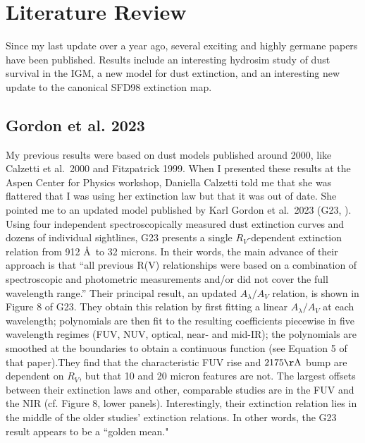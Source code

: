 \documentclass[11pt, oneside]{article}   	%
\begin{document}

\section{Literature Review}\label{sec:literature}
Since my last update over a year ago, several exciting and highly germane papers have been published. Results include an interesting hydrosim study of dust survival in the IGM, a new model for dust extinction, and an interesting new update to the canonical SFD98 extinction map. 
\subsection{Gordon et al. 2023}
My previous results were based on dust models published around 2000, like Calzetti et al.~2000 and Fitzpatrick 1999. When I presented these results at the Aspen Center for Physics workshop, Daniella Calzetti told me that she was flattered that I was using her extinction law but that it was out of date. She pointed me to an updated model published by Karl Gordon et al.~2023 (G23, \cite{2023ApJ...950...86G}). Using four independent spectroscopically measured dust extinction curves and dozens of individual sightlines, G23 presents a single $R_V$-dependent extinction relation from 912 \AA~to 32 microns. In their words, the main advance of their approach is that ``all previous R(V) relationships were based on a combination of spectroscopic and photometric measurements and/or did not cover the full wavelength range.'' Their principal result, an updated $A_\lambda/A_V$ relation, is shown in Figure 8 of G23. 
They obtain this relation by first fitting a linear $A_\lambda/A_V$ at each wavelength; polynomials are then fit to the resulting coefficients piecewise in five wavelength regimes (FUV, NUV, optical, near- and mid-IR); the polynomials are smoothed at the boundaries to obtain a continuous function (see Equation 5 of that paper).They find that the characteristic FUV rise and $2175 {\rm \AA}$ bump are dependent on $R_V$, but that 10 and 20 micron features are not. The largest offsets between their extinction laws and other, comparable studies are in the FUV and the NIR (cf. Figure 8, lower panels). Interestingly, their extinction relation lies in the middle of the older studies' extinction relations. In other words, the G23 result appears to be a ``golden mean." 
\end{document}
